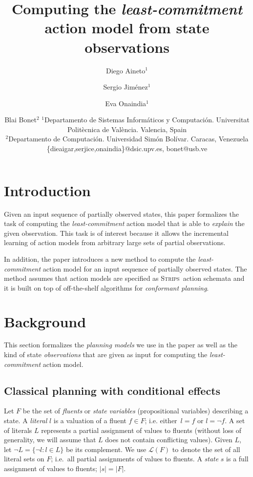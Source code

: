 \documentclass{article}
\title{Computing the {\em least-commitment} action model from state observations}
\author{
Diego Aineto$^1$\and
Sergio Jim\'enez$^1$\and
Eva Onaindia$^1$\And
\and
Blai Bonet$^2$
\affiliations
$^1${\small Departamento de Sistemas Inform\'aticos y Computaci\'on. Universitat Polit\`ecnica de Val\`encia. Valencia, Spain}\\
$^2${\small Departamento de Computaci\'on. Universidad Sim\'on Bolívar. Caracas, Venezuela}
\emails
{\scriptsize \{dieaigar,serjice,onaindia\}@dsic.upv.es, bonet@usb.ve}}
\newcommand{\strips}{\textsc{Strips}}
\begin{document}
\maketitle

\begin{abstract}
  
\end{abstract}

\section{Introduction}
Given an input sequence of partially observed states, this paper formalizes the task of computing the {\em least-commitment} action model that is able to {\em explain} the given observation. This task is of interest because it allows the incremental learning of action models from arbitrary large sets of partial observations.

In addition, the paper introduces a new method to compute the {\em least-commitment} action model for an input sequence of partially observed states. The method assumes that action models are specified as \strips\ action schemata and it is built on top of off-the-shelf algorithms for {\em conformant planning}.



\section{Background}
This section formalizes the {\em planning models} we use in the paper as well as the kind of state {\em observations} that are given as input for computing the {\em least-commitment} action model.  

\subsection{Classical planning with conditional effects}
Let $F$ be the set of {\em fluents} or {\em state variables} (propositional variables) describing a state. A {\em literal} $l$ is a valuation of a fluent $f\in F$; i.e. either~$l=f$ or $l=\neg f$. A set of literals $L$ represents a partial assignment of values to fluents (without loss of generality, we will assume that $L$ does not contain conflicting values). Given $L$, let $\neg L=\{\neg l:l\in L\}$ be its complement. We use $\mathcal{L}(F)$ to denote the set of all literal sets on $F$; i.e.~all partial assignments of values to fluents. A {\em state} $s$ is a full assignment of values to fluents; $|s|=|F|$.
\end{document}
